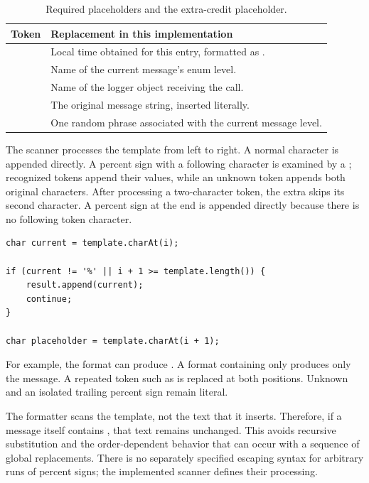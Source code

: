 \begin{table}[H]
\centering\small
\begin{tabularx}{\textwidth}{@{}lY@{}}
\toprule
\textbf{Token} & \textbf{Replacement in this implementation}\\
\midrule
{} & Local time obtained for this entry, formatted as .\\
 & Name of the current message's enum level.\\
 & Name of the logger object receiving the call.\\
 & The original message string, inserted literally.\\
 & One random phrase associated with the current message level.\\
\bottomrule
\end{tabularx}
\caption{Required placeholders and the extra-credit placeholder.}
\end{table}

The scanner processes the template from left to right. A normal character is appended directly. A percent sign with a following character is examined by a ; recognized tokens append their values, while an unknown token appends both original characters. After processing a two-character token, the extra  skips its second character. A percent sign at the end is appended directly because there is no following token character.

\begin{samepage}
\begin{lstlisting}
char current = template.charAt(i);

if (current != '%' || i + 1 >= template.length()) {
    result.append(current);
    continue;
}

char placeholder = template.charAt(i + 1);
\end{lstlisting}
\end{samepage}

For example, the format  can produce . A format containing only  produces only the message. A repeated token such as  is replaced at both positions. Unknown  and an isolated trailing percent sign remain literal.

The formatter scans the template, not the text that it inserts. Therefore, if a message itself contains , that text remains unchanged. This avoids recursive substitution and the order-dependent behavior that can occur with a sequence of global replacements. There is no separately specified escaping syntax for arbitrary runs of percent signs; the implemented scanner defines their processing.

